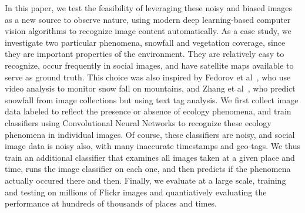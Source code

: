 In this paper, we test the feasibility of leveraging these noisy and
biased images as a new source to observe nature, using modern deep
learning-based computer vision algorithms to recognize image content
automatically.  As a case study, we investigate two particular
phenomena, snowfall and vegetation coverage, since they are important
properties of the environment. They are relatively easy to recognize,
occur frequently in social images, and have satellite maps available
to serve as ground truth. This choice was also inspired by Fedorov et
al~\cite{fedorov2015snowwatch,fedorov2014snow}, who use video analysis
to monitor snow fall on mountains, and Zhang et
al~\cite{ecology2012www}, who predict snowfall from image collections
but using text tag analysis.  We first collect image data labeled to
reflect the presence or absence of ecology phenomena, and train
classifiers using Convolutional Neural Networks to recognize these
ecology phenomena in individual images. Of course, these classifiers
are noisy, and social image data is noisy also, with many inaccurate
timestamps and geo-tags.  We thus train an additional classifier that
examines all images taken at a given place and time, runs the image
classifier on each one, and then predicts if the phenomena actually
occured there and then.  Finally, we evaluate at a large scale,
training and testing on millions of Flickr images and quantiatively
evaluating the performance at hundreds of thousands of places and
times.











